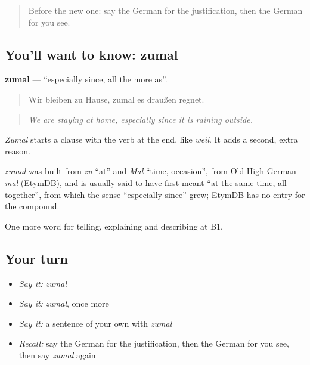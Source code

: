 \label{lesson:GE-C332-zumal}



\begin{quote}
Before the new one: say the German for the justification, then the German for you see.
\end{quote}

\subsection*{You'll want to know: zumal}
\textbf{zumal} — \textquotedblleft{}especially since, all the more as\textquotedblright{}.

\begin{quote}
Wir bleiben zu Hause, zumal es draußen regnet.
\end{quote}

\begin{quote}
\emph{We are staying at home, especially since it is raining outside.}
\end{quote}

\emph{Zumal} starts a clause with the verb at the end, like \emph{weil}. It adds a second, extra reason.

\begin{cousinweb}
\emph{zumal} was built from \emph{zu} \textquotedblleft{}at\textquotedblright{} and \emph{Mal} \textquotedblleft{}time, occasion\textquotedblright{}, from Old High German \emph{māl} (EtymDB), and is usually said to have first meant \textquotedblleft{}at the same time, all together\textquotedblright{}, from which the sense \textquotedblleft{}especially since\textquotedblright{} grew; EtymDB has no entry for the compound.
\end{cousinweb}

\begin{grammarlens}[title={What you've built}]
One more word for telling, explaining and describing at B1.
\end{grammarlens}

\subsection*{Your turn}
\begin{itemize}
\raggedright
  \item \emph{Say it:} \emph{zumal}
  \item \emph{Say it:} \emph{zumal}, once more
  \item \emph{Say it:} a sentence of your own with \emph{zumal}
  \item \emph{Recall:} say the German for the justification, then the German for you see, then say \emph{zumal} again
\end{itemize}

